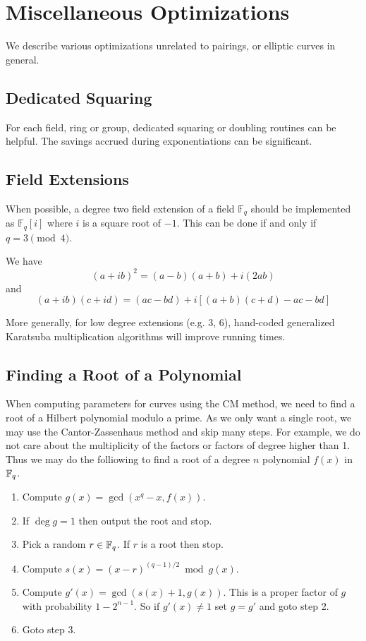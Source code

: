 \chapter{Miscellaneous Optimizations}

We describe various
optimizations unrelated to pairings, or elliptic curves in general.

\section{Dedicated Squaring}

For each field, ring or group, dedicated squaring or doubling routines
can be helpful. The savings accrued during exponentiations can be significant.

\section{Field Extensions}

When possible, a degree two field extension of a field $\mathbb{F}_q$
should be implemented as $\mathbb{F}_q[i]$ where $i$ is a square root of $-1$.
This can be done if and only if $q = 3 \pmod{4}$.

We have
\[ (a + i b)^2 = (a - b)(a + b) + i (2 a b) \]
and
\[ (a + i b)(c + i d) = (ac - bd) + i[(a + b)(c + d) - ac - bd] \]

More generally, for low degree extensions (e.g. 3, 6),
hand-coded generalized Karatsuba multiplication algorithms \cite{wpkaratsuba}
will improve running times.

\section{Finding a Root of a Polynomial}

When computing parameters for curves using the CM method, we
need to find a root of a Hilbert polynomial modulo a prime.
As we only want a single root, we may use the Cantor-Zassenhaus
method and skip many steps. For example, we do not care about
the multiplicity of the factors or factors of degree higher than 1.
Thus we may do the folliowing to find a root of a
degree $n$ polynomial $f(x)$ in
$\mathbb{F}_q$.

\begin{enumerate}
\item
Compute $g(x) = \gcd(x^q - x, f(x))$.
\item
If $\deg g = 1$ then output the root and stop.
\item
Pick a random $r \in \mathbb{F}_q$. If $r$ is a root then stop.
\item
Compute $s(x) = (x-r)^{(q-1)/2} \bmod g(x)$.
\item
Compute $g'(x) = \gcd(s(x)+1, g(x))$. This is a proper factor of $g$
with probability $1 - 2^{n-1}$. So if $g'(x) \ne 1$ set $g = g'$ and
goto step 2.
\item
Goto step 3.
\end{enumerate}

